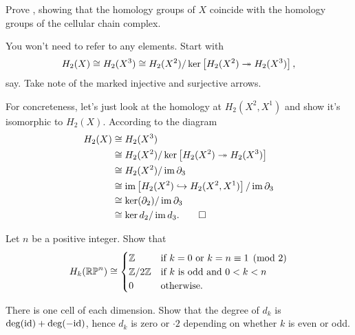 \begin{problem}
	\label{prob:diagram_chase}
	Prove ,
	showing that the homology groups of $X$
	coincide with the homology groups of the cellular chain complex.
	\begin{hint}
		You won't need to refer to any elements.
		Start with \[ H_2(X) \cong H_2(X^3) \cong
			H_2(X^2) / \ker \left[ H_2(X^2) \twoheadrightarrow H_2(X^3) \right], \] say.
		Take note of the marked injective and surjective arrows.
	\end{hint}
	\begin{sol}
		For concreteness, let's just look at the homology at $H_2(X^2, X^1)$
		and show it's isomorphic to $H_2(X)$.
		According to the diagram
		\begin{align*}
			H_2(X) &\cong H_2(X^3) \\
			&\cong H_2(X^2) / \ker \left[ H_2(X^2) \twoheadrightarrow H_2(X^3) \right] \\
			&\cong H_2(X^2) / \operatorname{im} \partial_3 \\
			&\cong \operatorname{im}\left[ H_2(X^2) \hookrightarrow H_2(X^2, X^1) \right] / \operatorname{im} \partial_3 \\
			&\cong \ker(\partial_2) / \operatorname{im}\partial_3 \\
			&\cong \ker d_2 / \operatorname{im} d_3. \qedhere
		\end{align*}
	\end{sol}
\end{problem}

\begin{dproblem}
	\onechili
	Let $n$ be a positive integer. Show that
	\[
		H_k(\mathbb{RP}^n)
		\cong
		\begin{cases}
			\mathbb Z & \text{if $k=0$ or $k=n\equiv 1 \pmod 2$} \\
			\mathbb Z/2\mathbb Z & \text{if $k$ is odd and $0 < k < n$} \\
			0 & \text{otherwise}.
		\end{cases}
	\]
	\begin{hint}
		There is one cell of each dimension.
		Show that the degree of $d_k$ is $\deg(\mathrm{id})+\deg(-\mathrm{id})$,
		hence $d_k$ is zero or $\cdot 2$ depending
		on whether $k$ is even or odd.
	\end{hint}
\end{dproblem}
